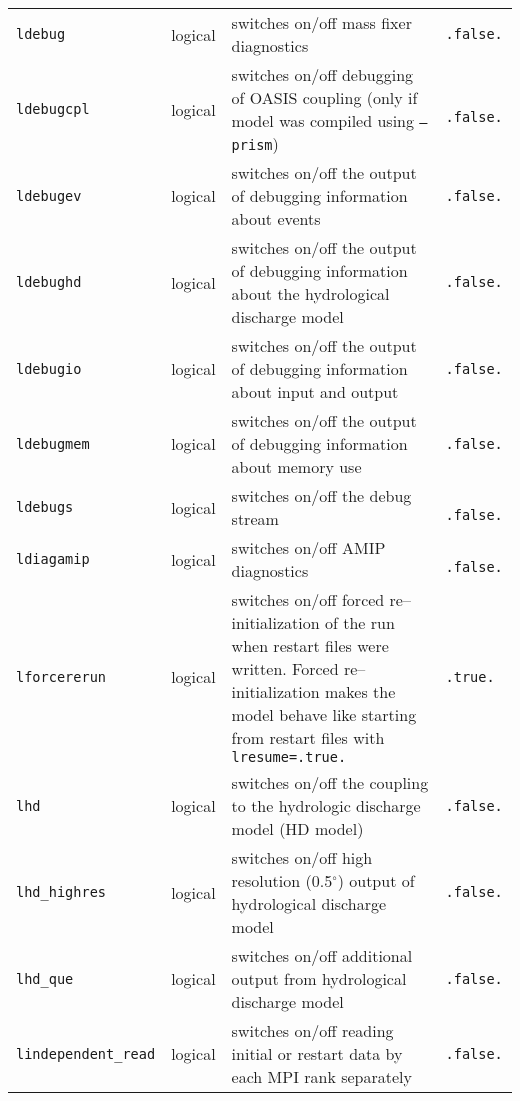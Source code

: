 \begin{longtable}{l@{\extracolsep\fill}lp{}p{3.5cm}}
{\tt ldebug}\index{namelist variables!ldebug}
 & logical     & switches on/off mass fixer diagnostics &
     {\tt .false.}\\
{\tt ldebugcpl}\index{namelist variables!ldebugcpl}
 & logical & switches on/off debugging of OASIS
coupling (only if model was compiled using {\tt --prism}) & {\tt
  .false.} \\
{\tt ldebugev}\index{namelist variables!ldebugev}
 & logical    & switches on/off the output of debugging
information about events & {\tt .false.}\\
{\tt ldebughd}\index{namelist variables!ldebughd}
 & logical     & switches on/off the output of
debugging information 
about the hydrological discharge model & {\tt .false.}\\
{\tt ldebugio}\index{namelist variables!ldebugio}
 & logical      & switches on/off the output of debugging
information about input and output & {\tt .false.}\\
{\tt ldebugmem}\index{namelist variables!ldebugmem}
 & logical     & switches on/off the output of debugging
information about memory use & {\tt .false.}\\
{\tt ldebugs}\index{namelist variables!ldebugs}
 & logical    & switches on/off the debug stream & {\tt
  .false.}\\
{\tt ldiagamip}\index{namelist variables!ldiagamip}
 & logical  & switches on/off AMIP diagnostics & {\tt
    .false. }\\
{\tt lforcererun}\index{namelist variables!lforcererun}
 & logical  & switches on/off forced re--initialization of the
 \echam{} run when restart files were written. Forced
 re--initialization makes the model behave like starting from restart
 files with {\tt lresume=.true.} & {\tt .true.} \\ 
{\tt lhd}\index{namelist variables!lhd}
 & logical        & switches on/off the coupling to the hydrologic
  discharge model (HD model) & {\tt .false.}\\
{\tt lhd\_highres}\index{namelist variables!lhd\_highres}
 & logical & switches on/off high resolution
(0.5$^\circ$) output of hydrological discharge model & {\tt .false.} \\
{\tt lhd\_que}\index{namelist variables!lhd\_que}
 & logical    &switches on/off additional output from
  hydrological discharge model & {\tt .false.}\\
{\tt lindependent\_read}\index{namelist variables!lindependent\_read}
 & logical & switches on/off reading initial or restart
data by each MPI rank separately & {\tt .false.}\\

\end{longtable}
